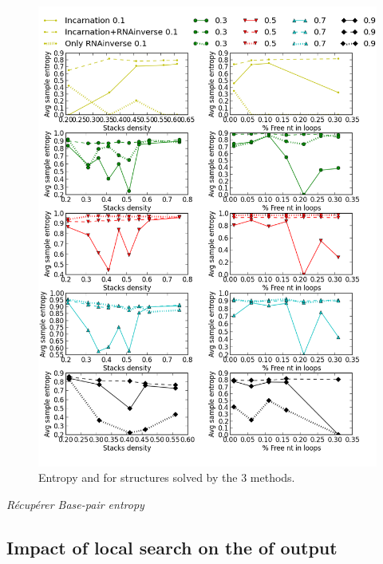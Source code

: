\begin{figure}[ht!]
	\centering
	\includegraphics[scale=0.4]{Figures/RNAinverse_data_100.png}
	\caption{Entropy and \GCContent  for structures solved by
	the 3 methods.}
	\label{fig:rnainverse}
\end{figure}
{\em Récupérer Base-pair entropy}


%
\subsection{Impact of local search on the \GCContent of \ourprog output}

